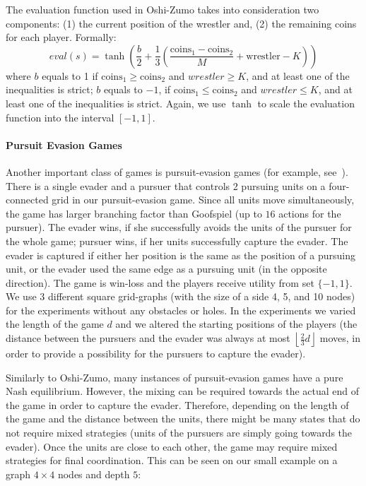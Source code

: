 \vspace{0.1cm}

The evaluation function used in Oshi-Zumo takes into consideration two components: (1) the current position of the wrestler and, (2) the remaining coins for each player. Formally:
$$
eval(s) = \tanh\left(\frac{b}{2}+\frac{1}{3}\left(\frac{\textrm{coins}_1 - \textrm{coins}_2}{M} + \textrm{wrestler} - K\right)\right)
$$
where $b$ equals to 1 if $\textrm{coins}_1 \geq \textrm{coins}_2$ and $wrestler \geq K$, and at least one of the inequalities is strict;
$b$ equals to $-1$, if $\textrm{coins}_1 \leq \textrm{coins}_2$ and $wrestler \leq K$, and at least one of the inequalities is strict.
Again, we use $\tanh$ to scale the evaluation function into the interval $[-1,1]$.

\paragraph{\textbf{Pursuit Evasion Games}}

Another important class of games is pursuit-evasion games (for example, see~\cite{nguyen2013monte}).
There is a single evader and a pursuer that controls 2 pursuing units on a four-connected grid in our pursuit-evasion game.
Since all units move simultaneously, the game has larger branching factor than Goofspiel (up to $16$ actions for the pursuer).
The evader wins, if she successfully avoids the units of the pursuer for the whole game; pursuer wins, if her units successfully capture the evader. The evader is captured if either her position is the same as the position of a pursuing unit, or the evader used the same edge as a pursuing unit (in the opposite direction).
The game is win-loss and the players receive utility from set $\lbrace -1, 1 \rbrace$.
We use $3$ different square grid-graphs (with the size of a side 4, 5, and 10 nodes) for the experiments without any obstacles or holes.
In the experiments we varied the length of the game $d$ and we altered the starting positions of the players (the distance between the pursuers and the evader was always at most $\left\lfloor\frac{2}{3} d\right\rfloor$ moves, in order to provide a possibility for the pursuers to capture the evader).

Similarly to Oshi-Zumo, many instances of pursuit-evasion games have a pure Nash equilibrium.
However, the mixing can be required towards the actual end of the game in order to capture the evader.
Therefore, depending on the length of the game and the distance between the units, there might be many states that do not require mixed strategies (units of the pursuers are simply going towards the evader).
Once the units are close to each other, the game may require mixed strategies for final coordination.
This can be seen on our small example on a graph $4\times4$ nodes and depth $5$:

